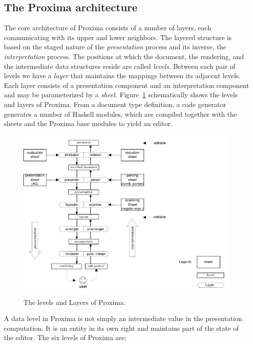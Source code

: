 \documentclass[10pt]{article}
\begin{document}
\subsection{The Proxima architecture}

The core architecture of Proxima consists of a number of layers, each communicating with its upper and lower neighbors. The layered structure is based on the staged nature of the {\em presentation} process and its inverse, the {\em interpretation} process. The positions at which the document, the rendering, and the intermediate data structures reside are called {\em levels}. Between each pair of levels we have a {\em layer} that maintains the mappings between its adjacent levels. Each layer consists of a presentation component and an interpretation component and may be parameterized by a {\em sheet}. Figure~\ref{fig:levelsAndLayers} schematically shows the levels and layers of Proxima. From a document type definition, a code generator generates a number of Haskell modules, which are compiled together with the sheets and the Proxima base modules to yield an editor. 

\begin{figure}
\begin{center}
\includegraphics[width=12cm]{images/LayerOverview}
\end{center}
\caption{The levels and Layers of Proxima.}
\label{fig:levelsAndLayers}
\end{figure}

A data level in Proxima is not simply an intermediate value in the presentation computation. It is an entity in its own right and maintains part of the state of the editor. The six levels of Proxima are:
\end{document}
